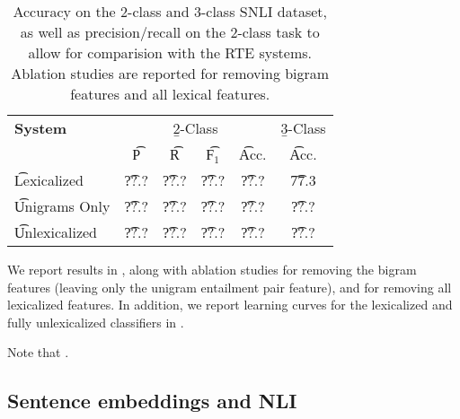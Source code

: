 \begin{table}
\begin{center}
\begin{tabular}{l@{\hskip \colspaceL}c@{\hskip \colspaceS}c@{\hskip \colspaceS}c@{\hskip \colspaceS}c@{\hskip \colspaceL}c}
\hline
\textbf{System} & \multicolumn{4}{c}{\b{2-Class}} & \b{3-Class} \\
 & \t{P} & \t{R} & \t{F$_1$} & \t{Acc.} & \t{Acc.} \\
\hline
\t{Lexicalized}            & \t{??.?} & \t{??.?} & \t{??.?} & \t{??.?} & \t{77.3} \\
\t{Unigrams Only}          & \t{??.?} & \t{??.?} & \t{??.?} & \t{??.?} & \t{??.?} \\
\t{Unlexicalized}          & \t{??.?} & \t{??.?} & \t{??.?} & \t{??.?} & \t{??.?} \\
\hline
\end{tabular}
\end{center}
\caption{
\label{tab:bowresults}
Accuracy on the 2-class and 3-class SNLI dataset, as well as precision/recall
  on the 2-class task to allow for comparision with the RTE systems.
Ablation studies are reported for removing bigram features and all lexical
  features.
}
\end{table}
%
%


We report results in , along with ablation studies for removing
  the bigram features (leaving only the unigram entailment pair feature),
  and for removing all lexicalized features.
In addition, we report learning curves for the lexicalized and fully unlexicalized
  classifiers in .

Note that .



\subsection{Sentence embeddings and NLI}\label{sentence-embedding}


